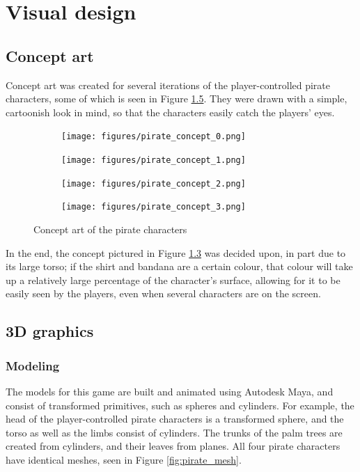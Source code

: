 \chapter{Visual design}\label{ch:visualDesign}
\section{Concept art}
Concept art was created for several iterations of the player-controlled pirate characters, some of which is seen in Figure \ref{fig:pirate_concepts}. They were drawn with a simple, cartoonish look in mind, so that the characters easily catch the players' eyes. 

\begin{figure}[h!]
    \centering
    \begin{subfigure}[b]{0.2\textwidth}
        \texttt{[image: figures/pirate\_concept\_0.png]}\caption{ \label{fig:pirate_concept_0}}
    \end{subfigure}
    \begin{subfigure}[b]{0.2\textwidth}
        \texttt{[image: figures/pirate\_concept\_1.png]}\caption{ \label{fig:pirate_concept_1}}
    \end{subfigure}
    \begin{subfigure}[b]{0.2\textwidth}
        \texttt{[image: figures/pirate\_concept\_2.png]}\caption{ \label{fig:pirate_concept_2}}
    \end{subfigure}
    \begin{subfigure}[b]{0.2\textwidth}
        \texttt{[image: figures/pirate\_concept\_3.png]}\caption{ \label{fig:pirate_concept_3}}
    \end{subfigure}
    \caption{Concept art of the pirate characters}\label{fig:pirate_concepts}
\end{figure}

In the end, the concept pictured in Figure \ref{fig:pirate_concept_2} was decided upon, in part due to its large torso; if the shirt and bandana are a certain colour, that colour will take up a relatively large percentage of the character's surface, allowing for it to be easily seen by the players, even when several characters are on the screen. 

\section{3D graphics}

\subsection{Modeling}
The models for this game are built and animated using Autodesk Maya, and consist of transformed primitives, such as spheres and cylinders. For example, the head of the player-controlled pirate characters is a transformed sphere, and the torso as well as the limbs consist of cylinders. The trunks of the palm trees are created from cylinders, and their leaves from planes. All four pirate characters have identical meshes, seen in Figure \ref{fig:pirate_mesh}.


